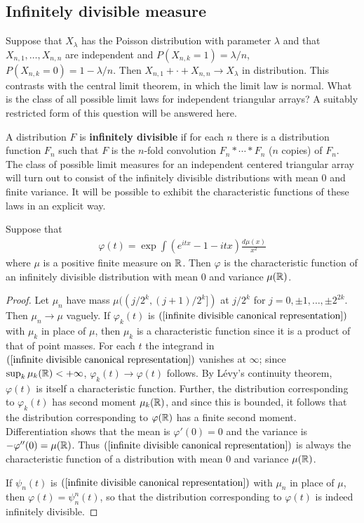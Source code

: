 \subsection{Infinitely divisible measure}
Suppose that $X_\lambda$ has the Poisson distribution with parameter $\lambda$ and that $X_{n,1},\dots,X_{n,n}$ are independent and $P(X_{n,k}=1)=\lambda/n$, $P(X_{n,k}=0)=1-\lambda/n$. Then $X_{n,1}+\cdot+X_{n,n}\to X_{\lambda}$ in distribution. This contrasts with the central limit theorem, in which the limit law is normal. What is the class of all possible limit laws for independent triangular arrays? A suitably restricted form of this question will be answered here.\par
A distribution $F$ is \textbf{infinitely divisible} if for each $n$ there is a distribution function $F_n$ such that $F$ is the $n$-fold convolution $F_n\ast\cdots\ast F_n$ ($n$ copies) of $F_n$. The class of possible limit measures for an independent centered triangular array will turn out to consist of the infinitely divisible distributions with mean $0$ and finite variance. It will be possible to exhibit the characteristic functions of these laws in an explicit way.
\begin{theorem}
Suppose that
\begin{align}\label{infinite divisible canonical representation}
\varphi(t)=\exp\int(e^{itx}-1-itx)\frac{d\mu(x)}{x^2}
\end{align}
where $\mu$ is a positive finite measure on $\mathbb{R}$. Then $\varphi$ is the characteristic function of an infinitely divisible distribution with mean $0$ and variance $\mu(\mathbb{R})$.
\end{theorem}
\begin{proof}
Let $\mu_n$ have mass $\mu((j/2^k,(j+1)/2^k])$ at $j/2^k$ for $j=0,\pm 1,\dots,\pm 2^{2k}$. Then $\mu_n\to\mu$ vaguely. If $\varphi_k(t)$ is $(\ref{infinite divisible canonical representation})$ with $\mu_k$ in place of $\mu$, then $\mu_k$ is a characteristic function since it is a product of that of point masses. For each $t$ the integrand in $(\ref{infinite divisible canonical representation})$ vanishes at $\infty$; since $\sup_k\mu_k(\mathbb{R})<+\infty$, $\varphi_k(t)\to\varphi(t)$ follows. By L\'evy's continuity theorem, $\varphi(t)$ is itself a characteristic function. Further, the distribution corresponding to $\varphi_k(t)$ has second moment $\mu_k(\mathbb{R})$, and since this is bounded, it follows that the distribution corresponding to $\varphi(\mathbb{R})$ has a finite second moment. Differentiation shows that the mean is $\varphi'(0)=0$ and the variance is $-\varphi''(0)=\mu(\mathbb{R})$. Thus $(\ref{infinite divisible canonical representation})$ is always the characteristic function of a distribution with mean $0$ and variance $\mu(\mathbb{R})$.\par
If $\psi_{n}(t)$ is $(\ref{infinite divisible canonical representation})$ with $\mu_n$ in place of $\mu$, then $\varphi(t)=\psi_{n}^n(t)$, so that the distribution corresponding to $\varphi(t)$ is indeed infinitely divisible.
\end{proof}
